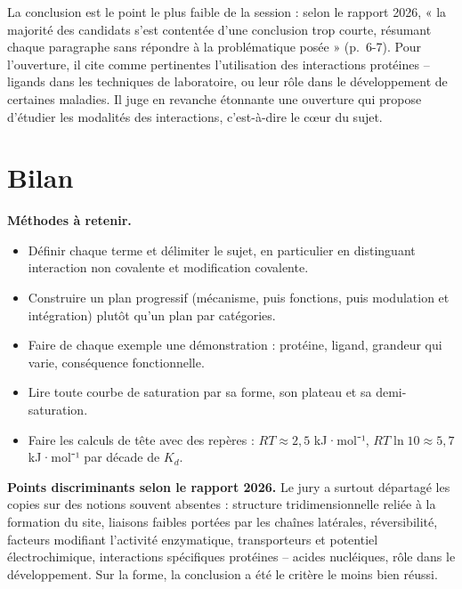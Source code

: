 \documentclass[11pt,a4paper]{article}
\providecommand{\tightlist}{\setlength{\itemsep}{0pt}\setlength{\parskip}{0pt}}
\begin{document}
\begin{jury}

La conclusion est le point le plus faible de la session : selon le rapport 2026, « la majorité des candidats s'est contentée d'une conclusion trop courte, résumant chaque paragraphe sans répondre à la problématique posée » (p.~6-7). Pour l'ouverture, il cite comme pertinentes l'utilisation des interactions protéines -- ligands dans les techniques de laboratoire, ou leur rôle dans le développement de certaines maladies. Il juge en revanche étonnante une ouverture qui propose d'étudier les modalités des interactions, c'est-à-dire le cœur du sujet.

\end{jury}

\hypertarget{bilan}{%
\section{Bilan}\label{bilan}}

\textbf{Méthodes à retenir.}

\begin{itemize}
\tightlist
\item
  Définir chaque terme et délimiter le sujet, en particulier en distinguant interaction non covalente et modification covalente.
\item
  Construire un plan progressif (mécanisme, puis fonctions, puis modulation et intégration) plutôt qu'un plan par catégories.
\item
  Faire de chaque exemple une démonstration : protéine, ligand, grandeur qui varie, conséquence fonctionnelle.
\item
  Lire toute courbe de saturation par sa forme, son plateau et sa demi-saturation.
\item
  Faire les calculs de tête avec des repères : \(RT \approx 2{,}5\) kJ·mol⁻¹, \(RT\ln 10 \approx 5{,}7\) kJ·mol⁻¹ par décade de \(K_d\).
\end{itemize}

\textbf{Points discriminants selon le rapport 2026.} Le jury a surtout départagé les copies sur des notions souvent absentes : structure tridimensionnelle reliée à la formation du site, liaisons faibles portées par les chaînes latérales, réversibilité, facteurs modifiant l'activité enzymatique, transporteurs et potentiel électrochimique, interactions spécifiques protéines -- acides nucléiques, rôle dans le développement. Sur la forme, la conclusion a été le critère le moins bien réussi.
\end{document}

